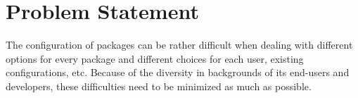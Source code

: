 \section{Problem Statement}

The configuration of packages can be rather difficult when dealing with different options for every package and different choices for each user, existing configurations, etc. 
Because of the diversity in backgrounds of its end-users and developers, these difficulties need to be minimized as much as possible.
